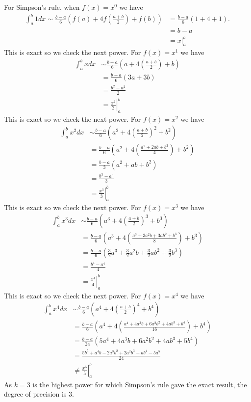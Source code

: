 {\noindent For Simpson's rule, when $f(x)=x^0$ we have
\begin{align*}
\int_a^b 1 dx \sim \frac{b-a}{6}\left(f(a) + 4f\left(\frac{a+b}{2}\right)+ f(b) \right)  &= \frac{b-a}{6}\left(1 + 4+ 1 \right). \\
&= b-a \\
&= \left. x \right|_a^b
\end{align*}
This is exact so we check the next power. For $f(x)=x^1$ we have
\begin{align*}
\int_a^b x dx &\sim \frac{b-a}{6}\left(a + 4\left(\frac{a+b}{2}\right)+ b \right)  \\
&= \frac{b-a}{6}\left(3a + 3b \right) \\
&= \frac{b^2-a^2}{2}\\
&= \left.\frac{x^2}{2} \right|_a^b
\end{align*}
This is exact so we check the next power. For $f(x)=x^2$ we have
\begin{align*}
\int_a^b x^2 dx &\sim \frac{b-a}{6}\left(a^2 + 4\left(\frac{a+b}{2}\right)^2+ b^2 \right)  \\
&= \frac{b-a}{6}\left(a^2 + 4\left(\frac{a^2+2ab + b^2}{4}\right)+ b^2 \right)  \\
&= \frac{b-a}{3}\left(a^2 +ab + b^2 \right) \\
&= \frac{b^3-a^3}{3} \\
&= \left.\frac{x^3}{3} \right|_a^b
\end{align*}
This is exact so we check the next power. For $f(x)=x^3$ we have
\begin{align*}
\int_a^b x^3 dx &\sim \frac{b-a}{6}\left(a^3 + 4\left(\frac{a+b}{2}\right)^3+ b^3 \right)  \\
&= \frac{b-a}{6}\left(a^3 + 4\left(\frac{a^3+3a^2b + 3ab^2  + b^3}{8}\right)+ b^3 \right)  \\
&= \frac{b-a}{6}\left(\frac{3}{2}a^3 + \frac{3}{2}a^2b + \frac{3}{2}ab^2+ \frac{3}{2}b^3 \right)  \\
&= \frac{b^4 - a^4}{4} \\
&= \left.\frac{x^4}{4} \right|_a^b
\end{align*}
This is exact so we check the next power. For $f(x)=x^4$ we have
\begin{align*}
\int_a^b x^4 dx &\sim \frac{b-a}{6}\left(a^4 + 4\left(\frac{a+b}{2}\right)^4+ b^4 \right)  \\
&= \frac{b-a}{6}\left(a^4 + 4\left(\frac{a^4 + 4 a^3 b + 6 a^2 b^2 + 4 a b^3  + b^4}{16}\right)+ b^4 \right)  \\
&= \frac{b-a}{24}\left(5 a^4 + 4 a^3 b + 6 a^2 b^2 + 4 a b^3  + 5 b^4 \right)  \\
&= \frac{5 b^5 + a^4 b - 2 a^3 b^2 + 2 a^2 b^3 - a b^4 - 5 a^5}{24}  \\
& \neq \left.\frac{x^5}{5} \right|_a^b
\end{align*}
As $k=3$ is the highest power for which Simpson's rule gave the exact result, the degree of precision is 3.
}{\downline}


